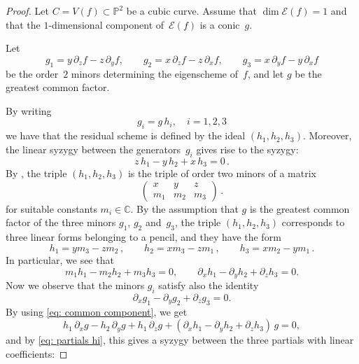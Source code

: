 \documentclass[a4paper, 11pt, reqno]{amsart}
\theoremstyle{plain}
\theoremstyle{definition}
\newcommand{\C}{\mathbb{C}}
\newcommand{\p}{\mathbb{P}}
\newcommand{\de}{\partial}
\newcommand{\Eig}[1]{\mathcal{E}\!\left( {#1} \right)}
\begin{document}
\begin{proof}
    

Let $C = V(f) \subset \p^2$ be a cubic curve.
Assume that $\dim \Eig{f} = 1$ and that the $1$-dimensional component of~$\Eig{f}$ is a conic~$g$.

Let 
\begin{equation}\label{eq: 3 minors}
g_1=y \,\partial_z f - z \,\partial_y f, \qquad g_2=x\,\partial_z f - z\, \partial_x f, \qquad g_3= x \,\partial_y f - y \,\partial_x f
\end{equation}
be the order~$2$ minors determining the eigenscheme of~$f$, and let $g$ be the greatest common factor.

By writing
%
\begin{equation}\label{eq: common component}
    g_i = g \, h_i, \quad i=1,2,3
\end{equation}
%
we have that the residual scheme is defined by the ideal
$(h_1,h_2,h_3)$. Moreover, the
linear
syzygy between the generators~$g_i$ gives rise to the syzygy:
%
\[
  z\, h_1 - y\, h_2 + x\, h_3 = 0 \,.
\]
%
By , the triple $(h_1,h_2,h_3)$ is the triple of order two minors of a matrix
%
\[
  \begin{pmatrix}
    x & y & z \\
    m_1 & m_2 & m_3
  \end{pmatrix} \,.
\]
%
for suitable constants $m_i \in \C$.
By the assumption that $g$ is the greatest common factor of the three minors $g_1$, $g_2$ and~$g_3$, the triple $(h_1,h_2,h_3)$ corresponds to three linear forms belonging to a pencil, and 
they have the form
\[
 h_1 = ym_3-zm_2 \,, \qquad
  h_2 = xm_3-zm_1 \,, \qquad
  h_3 = xm_2-ym_1 \,.
\]
In particular, we see that 
\begin{equation}\label{eq: partials hi}
m_1 h_1 -m_2 h_2 +m_3h_3=0, \qquad 
\de_x h_1 - \de_y h_2 +\de_z h_3=0.
\end{equation}
Now we observe that the minors $g_i$ satisfy also the identity
\begin{equation}\label{eq: partials}
    \partial_x g_1 - \partial_y g_2 +\partial_z g_3=0.
\end{equation}
By using \eqref{eq: common component}, we get
\begin{equation}\label{eq: differential relation}
  h_1 \, \de_x g - h_2\, \de_y g +h_1 \, \de_z g+ ( \de_xh_1 -\de_y h_2 + \de_z h_3) \, g =0, 
\end{equation}
and by \eqref{eq: partials hi}, this gives a syzygy between the three partials
with linear coefficients:

\end{proof}
\end{document}
